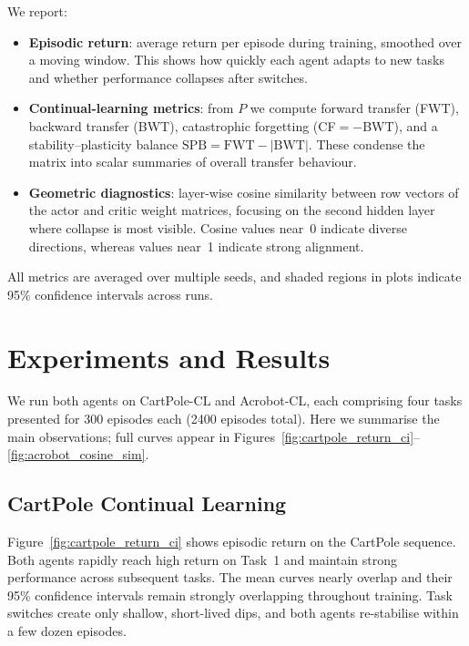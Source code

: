 \documentclass[conference]{IEEEtran}
\begin{document}
We report:

\begin{itemize}
    \item \textbf{Episodic return}: average return per episode during training, smoothed over a moving window. This shows how quickly each agent adapts to new tasks and whether performance collapses after switches.
    \item \textbf{Continual-learning metrics}: from $P$ we compute forward transfer (FWT), backward transfer (BWT), catastrophic forgetting (CF$=-$BWT), and a stability--plasticity balance $\text{SPB}=\text{FWT}-|\text{BWT}|$. These condense the matrix into scalar summaries of overall transfer behaviour.
    \item \textbf{Geometric diagnostics}: layer-wise cosine similarity between row vectors of the actor and critic weight matrices, focusing on the second hidden layer where collapse is most visible. Cosine values near~0 indicate diverse directions, whereas values near~1 indicate strong alignment.
\end{itemize}

All metrics are averaged over multiple seeds, and shaded regions in plots indicate 95\% confidence intervals across runs.

\section{Experiments and Results}
\label{sec:results}

We run both agents on CartPole-CL and Acrobot-CL, each comprising four tasks presented for 300 episodes each (2400 episodes total). Here we summarise the main observations; full curves appear in Figures~\ref{fig:cartpole_return_ci}–\ref{fig:acrobot_cosine_sim}.

\subsection{CartPole Continual Learning}

Figure~\ref{fig:cartpole_return_ci} shows episodic return on the CartPole sequence. Both agents rapidly reach high return on Task~1 and maintain strong performance across subsequent tasks. The mean curves nearly overlap and their 95\% confidence intervals remain strongly overlapping throughout training. Task switches create only shallow, short-lived dips, and both agents re-stabilise within a few dozen episodes.
\end{document}
